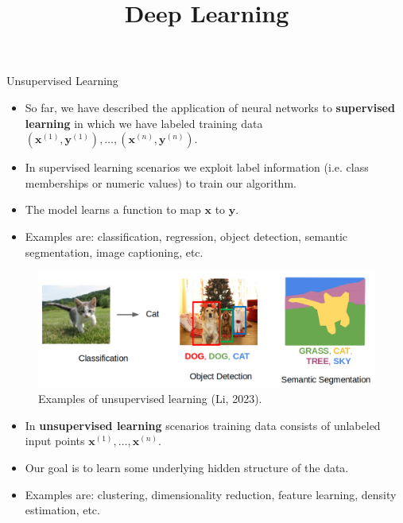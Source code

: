 




\title{Deep Learning}
\date{}


\newcommand{\titlefigure}{plots/unsupervised_3.png}
\newcommand{\learninggoals}{
  \item Unsupervised learning tasks
  \item Unsupervised deep learning
}




\begin{vbframe}{Unsupervised Learning}
  \begin{itemize}
    \item So far, we have described the application of neural networks to %
     \textbf{supervised learning}  in which we have labeled training data $(\pmb{x}^{(1)}, \pmb{y}^{(1)}), \dots, (\pmb{x}^{(n)}, \pmb{y}^{(n)})$.
    \item In supervised learning scenarios
   we exploit label information (i.e. class memberships or numeric values) to train our algorithm. %
    \item%
    The model learns a function to map $\pmb{x}$ to $\pmb{y}$.
    \item Examples are: classification, regression, object detection, semantic segmentation, image captioning, etc.
  \end{itemize}
    
        \begin{figure}
            \centering
            \includegraphics[width=0.6\linewidth]{plots/supervised.png}
           \caption{Examples of unsupervised learning (Li, 2023).}
        \end{figure}
    
    \framebreak
    
    \begin{itemize}
      \item In \textbf{unsupervised learning} scenarios
      training data consists of unlabeled input points $\pmb{x}^{(1)}, \dots, \pmb{x}^{(n)}$.
      \item Our goal is to learn some underlying hidden structure of the data.
      \item Examples are: clustering, dimensionality reduction, feature learning, density estimation, etc.
    \end{itemize}

\end{vbframe}

